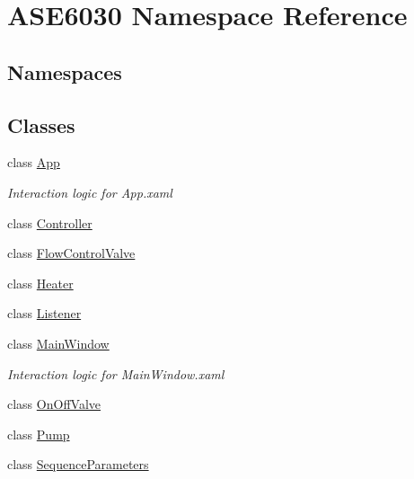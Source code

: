 \hypertarget{namespace_a_s_e6030}{}\section{A\+S\+E6030 Namespace Reference}
\label{namespace_a_s_e6030}
\subsection*{Namespaces}
\begin{DoxyCompactItemize}
\end{DoxyCompactItemize}
\subsection*{Classes}
\begin{DoxyCompactItemize}
\item 
class \hyperlink{class_a_s_e6030_1_1_app}{App}
\begin{DoxyCompactList}\small\item\em Interaction logic for App.\+xaml \end{DoxyCompactList}\item 
class \hyperlink{class_a_s_e6030_1_1_controller}{Controller}
\item 
class \hyperlink{class_a_s_e6030_1_1_flow_control_valve}{Flow\+Control\+Valve}
\item 
class \hyperlink{class_a_s_e6030_1_1_heater}{Heater}
\item 
class \hyperlink{class_a_s_e6030_1_1_listener}{Listener}
\item 
class \hyperlink{class_a_s_e6030_1_1_main_window}{Main\+Window}
\begin{DoxyCompactList}\small\item\em Interaction logic for Main\+Window.\+xaml \end{DoxyCompactList}\item 
class \hyperlink{class_a_s_e6030_1_1_on_off_valve}{On\+Off\+Valve}
\item 
class \hyperlink{class_a_s_e6030_1_1_pump}{Pump}
\item 
class \hyperlink{class_a_s_e6030_1_1_sequence_parameters}{Sequence\+Parameters}
\end{DoxyCompactItemize}
